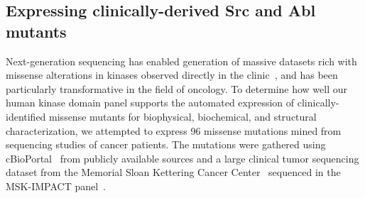 \documentclass[phd,tocprelim]{cornell}
\begin{document}
\subsection{Expressing clinically-derived Src and Abl mutants}
Next-generation sequencing has enabled generation of massive datasets rich with missense alterations in kinases observed directly in the clinic~\citep{Varghese:2014jw,Zehir:2017ib,Garraway:2013kn}, and has been particularly transformative in the field of oncology. 
To determine how well our human kinase domain panel supports the automated expression of clinically-identified missense mutants for biophysical, biochemical, and structural characterization, we attempted to express 96 missense mutations mined from sequencing studies of cancer patients. 
The mutations were gathered using cBioPortal~\citep{cBioPortal} from publicly available sources and a large clinical tumor sequencing dataset from the Memorial Sloan Kettering Cancer Center~\citep{Zehir:2017ib} sequenced in the MSK-IMPACT panel~\citep{msk-impact}. 

	
\end{document}
